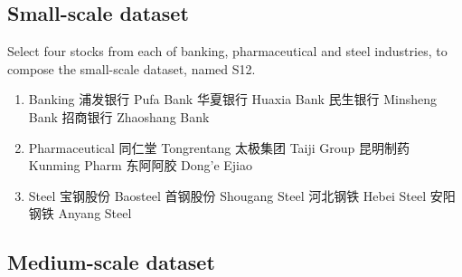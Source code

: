 \documentclass[12pt,a4paper]{article}
\begin{document}
\begin{CJK*}{UTF8}{song}
\subsection{Small-scale dataset}
Select four stocks from each of banking, pharmaceutical and steel industries, to compose the small-scale dataset, named S12.
\begin{multicols}{2}
\begin{enumerate}
\item Banking
 浦发银行 Pufa Bank
 华夏银行 Huaxia Bank
 民生银行 Minsheng Bank
 招商银行 Zhaoshang Bank
\item Pharmaceutical
 同仁堂 Tongrentang
 太极集团 Taiji Group
 昆明制药 Kunming Pharm
 东阿阿胶 Dong'e Ejiao
\item Steel
 宝钢股份 Baosteel
 首钢股份 Shougang Steel
 河北钢铁 Hebei Steel
 安阳钢铁 Anyang Steel
\end{enumerate}
\end{multicols}

\subsection{Medium-scale dataset}

\end{CJK*}
\end{document}
